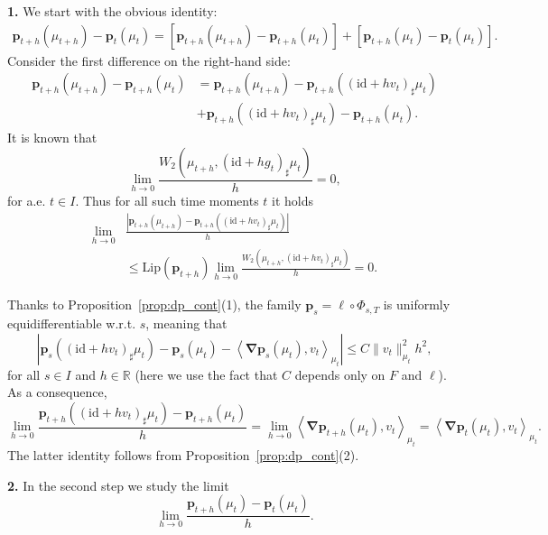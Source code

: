 \documentclass[sn-mathphys-num]{sn-jnl}
\numberwithin{equation}{section}
\theoremstyle{mythm}
\theoremstyle{mydef}
\newenvironment{proofof}[1]{\smallskip\noindent{\textbf{Proof~of~#1.}}%
  \hspace{1pt}}{\hspace{-5pt}{\nobreak\quad\nobreak\hfill\nobreak%
    $\square$\vspace{2pt}\par}\smallskip\goodbreak}
\newcommand{\Lip}{\mathrm{Lip}}
\newcommand{\id}{\mathrm{id}}
\renewcommand{\mathbf}[1]{\bm{#1}}
\begin{document}
\begin{proofof}{Proposition~\ref{prop:sysdif}}
  \textbf{1.} We start with the obvious identity:
  \begin{align*}
    \mathbf{p}_{t+h}(\mu_{t+h}) - \mathbf{p}_t(\mu_t) =
    \left[\mathbf{p}_{t+h}(\mu_{t+h}) - \mathbf{p}_{t+h}(\mu_t)\right] + \left[\mathbf{p}_{t+h}(\mu_t) - \mathbf{p}_t(\mu_t)\right].
  \end{align*}
  Consider the first difference on the right-hand side:
  \begin{align*}
   \mathbf{p}_{t+h}(\mu_{t+h}) - \mathbf{p}_{t+h}(\mu_t) &=  \mathbf{p}_{t+h}(\mu_{t+h}) - \mathbf{p}_{t+h}((\id+h v_t)_{\sharp}\mu_t)
   \\&+ \mathbf{p}_{t+h}((\id+h v_{t})_{\sharp} \mu_t) - \mathbf{p}_{t+h}(\mu_t).
  \end{align*}
It is known that
  \[
    \lim_{h\to 0}\frac{W_2\left(\mu_{t+h},(\id + h g_t)_{\sharp}\mu_t\right)}{h} = 0,
  \]
  for a.e. \( t\in I \).
  Thus for all such time moments \( t \) it holds
  \begin{align*}
    \lim_{h\to0} & \frac{\left|\mathbf{p}_{t+h}(\mu_{t+h}) - \mathbf{p}_{t+h}((\id +h v_{t})_{\sharp}\mu_t)\right|}{h}\\
    &\le
    \Lip(\mathbf{p}_{t+h})\lim_{h\to0}\frac{W_2\left(\mu_{t+h},(\id +h v_{t})_{\sharp}\mu_t\right)}{h} = 0.
  \end{align*}

  Thanks to Proposition~\ref{prop:dp_cont}(1), the family \( \mathbf{p}_s = \ell \circ \Phi_{s,T}\) is uniformly equidifferentiable w.r.t. $s$, meaning that
  \[
    \left|\mathbf{p}_{s}((\id +h v_t)_{\sharp}\mu_t) - \mathbf{p}_{s}(\mu_t) - \left<\bm \nabla \mathbf{p}_{s}(\mu_t), v_t\right>_{\mu_t}\right|\le C\|v_t\|^2_{\mu_t}h^2,
  \]
  for all \( s\in I \) and \( h\in \mathbb{R} \) (here we use the fact that \( C \) depends only on \( F \) and \( \ell \)).
  As a consequence,
 \[
   \lim_{h\to 0}\frac{\mathbf{p}_{t+h}((\id+h v_{t})_{\sharp} \mu_t) - \mathbf{p}_{t+h}(\mu_t)}{h} = \lim_{h\to 0} \left< \bm \nabla \mathbf{p}_{t+h}(\mu_t),v_t \right>_{\mu_t} = \left< \bm \nabla \mathbf{p}_{t}(\mu_t),v_t \right>_{\mu_t}.
 \]
 The latter identity follows from Proposition~\ref{prop:dp_cont}(2).

 \textbf{2.} In the second step we study the limit
  \[
    \lim_{h\to0}\frac{\mathbf{p}_{t+h}(\mu_t) - \mathbf{p}_t(\mu_t)}{h}.
  \]


\end{proofof}
\end{document}
